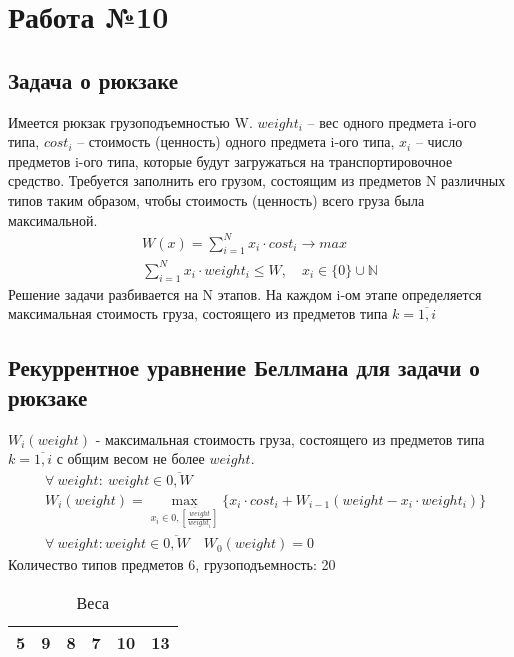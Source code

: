 \documentclass[17pt]{extarticle}
\begin{document}
\section*{Работа №10}
\subsection*{Задача о рюкзаке}
Имеется рюкзак грузоподъемностью W.
$weight_i$ – вес одного предмета i-ого типа,
$cost_i$ – стоимость (ценность) одного предмета i-ого типа,
$x_i$ – число предметов i-ого типа, которые будут загружаться на транспортировочное средство. Требуется заполнить его грузом, состоящим из предметов N различных типов таким образом, чтобы стоимость (ценность) всего груза была максимальной.
\[
    \begin{aligned}
        W(x)=\sum_{i=1}^{N} x_i \cdot cost_i \rightarrow max \\
        \sum_{i=1}^{N} x_i \cdot weight_i \leq W, \quad x_i \in \{0\} \cup \mathbb{N}
    \end{aligned}
\]
Решение задачи разбивается на N этапов. На каждом i-ом этапе определяется максимальная стоимость груза, состоящего из предметов типа $k=\overline{1,i}$
\subsection*{Рекуррентное уравнение Беллмана для задачи о рюкзаке}
$W_i(weight)$ - максимальная стоимость груза, состоящего из предметов типа $k=\overline{1,i}$ с общим весом не более $weight$.
\[
    \begin{aligned}
         & \forall \ weight \colon \ weight \in \overline{0,W}                                                                                         \\
         & W_i(weight) = \max_{x_i \in \overline{0, \left[\frac{weight}{weight_i}\right]}} \{x_i \cdot cost_i + W_{i-1}(weight - x_i \cdot weight_i)\} \\
         & \forall \ weight \colon weight \in \overline{0,W} \quad  W_0(weight)=0
    \end{aligned}
\]
Количество типов предметов 6, грузоподъемность: 20
\begin{table}[H]
    \centering
    \begin{tabular}{|c|c|c|c|c|c|}
        \hline
        5 & 9 & 8 & 7 & 10 & 13 \\
        \hline
    \end{tabular}
    \caption*{Веса}
\end{table}
\end{document}
